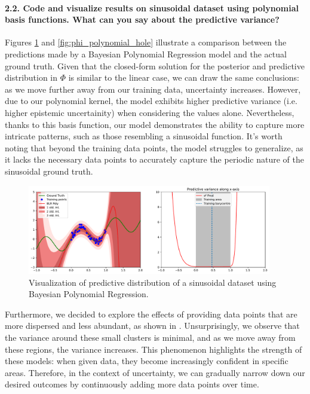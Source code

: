 \paragraph*{2.2. Code and visualize results on sinusoidal dataset using polynomial basis functions. What can you say about the predictive variance?}

Figures \ref{fig:phi_polynomial} and \ref{fig:phi_polynomial_hole} illustrate a comparison between the predictions made by a Bayesian Polynomial Regression model and the actual ground truth. Given that the closed-form solution for the posterior and predictive distribution in $\Phi$ is similar to the linear case, we can draw the same conclusions: as we move further away from our training data, uncertainty increases. However, due to our polynomial kernel, the model exhibits higher predictive variance (i.e. higher epistemic uncertainity) when considering the values alone. Nevertheless, thanks to this basis function, our model demonstrates the ability to capture more intricate patterns, such as those resembling a sinusoidal function. It's worth noting that beyond the training data points, the model struggles to generalize, as it lacks the necessary data points to accurately capture the periodic nature of the sinusoidal ground truth. %

\begin{figure}[H]
    \centering
    \includegraphics[width=0.95\textwidth]{phi_polynomial.pdf}
    \caption{Visualization of predictive distribution of a sinusoidal dataset using Bayesian Polynomial Regression.}
    \label{fig:phi_polynomial}
\end{figure}

Furthermore, we decided to explore the effects of providing data points that are more dispersed and less abundant, as shown in . Unsurprisingly, we observe that the variance around these small clusters is minimal, and as we move away from these regions, the variance increases. This phenomenon highlights the strength of these models: when given data, they become increasingly confident in specific areas. Therefore, in the context of uncertainty, we can gradually narrow down our desired outcomes by continuously adding more data points over time.

